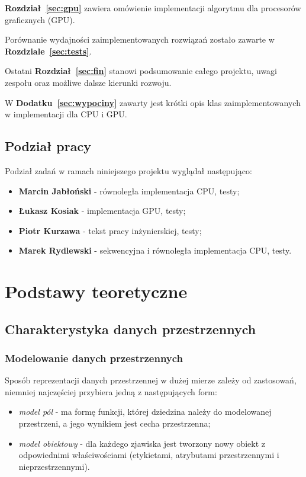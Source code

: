 \documentclass[12pt]{article}
\newcounter{algorytm}
\begin{document}
\textbf{Rozdział~\ref{sec:gpu}} zawiera omówienie implementacji algorytmu dla procesorów graficznych (GPU).

Porównanie wydajności zaimplementowanych rozwiązań zostało zawarte w \textbf{Rozdziale~\ref{sec:tests}}. 

Ostatni \textbf{Rozdział~\ref{sec:fin}} stanowi podsumowanie całego projektu, uwagi zespołu oraz możliwe dalsze kierunki rozwoju.

W \textbf{Dodatku~\ref{sec:wypociny}} zawarty jest krótki opis klas zaimplementowanych w implementacji dla CPU i GPU.

\subsection{Podział pracy}

Podział zadań w ramach niniejszego projektu wyglądał następująco:

\begin{itemize}
\item \textbf{Marcin Jabłoński} - równoległa implementacja CPU, testy;
\item \textbf{Łukasz Kosiak} - implementacja GPU, testy;
\item \textbf{Piotr Kurzawa} - tekst pracy inżynierskiej, testy;
\item \textbf{Marek Rydlewski} - sekwencyjna i równoległa implementacja CPU, testy.
\end{itemize}

\newpage

\section{Podstawy teoretyczne}
\label{sec:theory}

\subsection{Charakterystyka danych przestrzennych}

\subsubsection{Modelowanie danych przestrzennych}

Sposób reprezentacji danych przestrzennej w dużej mierze zależy od zastosowań, niemniej najczęściej przybiera jedną z następujących form:

\begin{itemize}
\item \textit{model pól} - ma formę funkcji, której dziedzina należy do modelowanej przestrzeni, a jego wynikiem jest cecha przestrzenna;
\item \textit{model obiektowy} - dla każdego zjawiska jest tworzony nowy obiekt z odpowiednimi właściwościami (etykietami, atrybutami przestrzennymi i nieprzestrzennymi).
\end{itemize}
\end{document}
